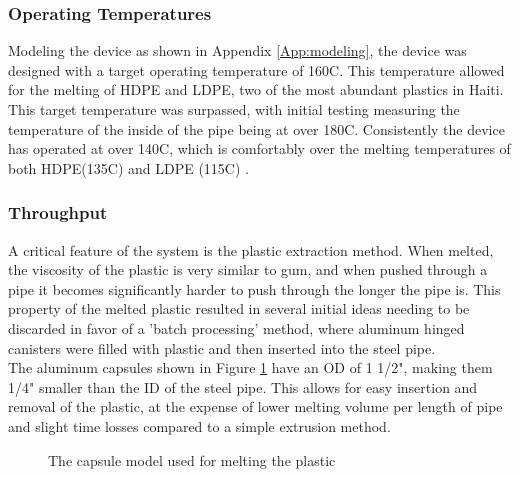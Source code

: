 \documentclass[11pt,english]{article}
\begin{document}
\subsubsection*{Operating Temperatures}
Modeling the device as shown in Appendix \ref{App:modeling}, the device was designed with a target operating temperature of 160\degree C. This temperature allowed for the melting of HDPE and LDPE, two of the most abundant plastics in Haiti\cite{sarker2011abundant}. This target temperature was surpassed, with initial testing measuring the temperature of the inside of the pipe being at over 180\degree C. Consistently the device has operated at over 140\degree C, which is comfortably over the melting temperatures of both HDPE(135\degree C) and LDPE (115\degree C) \cite{troughton2008handbook}.
\subsubsection*{Throughput}
A critical feature of the system is the plastic extraction method. When melted, the viscosity of the plastic is very similar to gum, and when pushed through a pipe it becomes significantly harder to push through the longer the pipe is. This property of the melted plastic resulted in several initial ideas needing to be discarded in favor of a 'batch processing' method, where aluminum hinged canisters were filled with plastic and then inserted into the steel pipe. \\

\noindent The aluminum capsules shown in Figure \ref{fig:canister} have an OD of 1 1/2", making them 1/4" smaller than the ID of the steel pipe. This allows for easy insertion and removal of the plastic, at the expense of lower melting volume per length of pipe and slight time losses compared to a simple extrusion method. 



 \begin{figure}[ht!]%
    \centering
    \qquad
    \caption{The capsule model used for melting the plastic}%
    \label{fig:canister}%
\end{figure}
\end{document}
